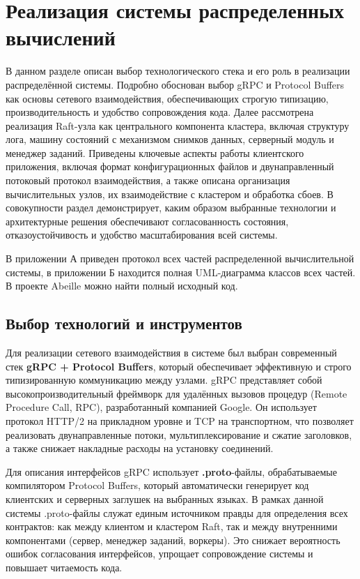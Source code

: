 \section{Реализация системы распределенных вычислений}

В данном разделе описан выбор технологического стека и его роль в реализации
распределённой системы. Подробно обоснован выбор gRPC и Protocol Buffers как
основы сетевого взаимодействия, обеспечивающих строгую типизацию,
производительность и удобство сопровождения кода. Далее рассмотрена реализация
Raft-узла как центрального компонента кластера, включая структуру лога, машину
состояний с механизмом снимков данных, серверный модуль и менеджер заданий.
Приведены ключевые аспекты работы клиентского приложения, включая формат
конфигурационных файлов и двунаправленный потоковый протокол взаимодействия, а
также описана организация вычислительных узлов, их взаимодействие с кластером и
обработка сбоев. В совокупности раздел демонстрирует, каким образом выбранные
технологии и архитектурные решения обеспечивают согласованность состояния,
отказоустойчивость и удобство масштабирования всей системы.

В приложении А приведен протокол всех частей распределенной вычислительной
системы, в приложении Б находится полная UML-диаграмма классов всех частей. В
проекте Abeille \cite{abeille} можно найти полный исходный код.

\subsection{Выбор технологий и инструментов}

Для реализации сетевого взаимодействия в системе был выбран современный
стек \textbf{gRPC + Protocol Buffers}, который обеспечивает эффективную
и строго типизированную коммуникацию между узлами.
gRPC представляет собой высокопроизводительный фреймворк для удалённых
вызовов процедур (Remote Procedure Call, RPC), разработанный компанией Google.
Он использует протокол HTTP/2 на прикладном уровне и TCP на транспортном,
что позволяет реализовать двунаправленные потоки, мультиплексирование
и сжатие заголовков, а также снижает накладные расходы на установку соединений.

Для описания интерфейсов gRPC использует \textbf{.proto}-файлы,
обрабатываемые компилятором Protocol Buffers, который автоматически
генерирует код клиентских и серверных заглушек на выбранных языках.
В рамках данной системы .proto-файлы служат единым источником правды
для определения всех контрактов: как между клиентом и кластером Raft,
так и между внутренними компонентами (сервер, менеджер заданий, воркеры).
Это снижает вероятность ошибок согласования интерфейсов,
упрощает сопровождение системы и повышает читаемость кода.

